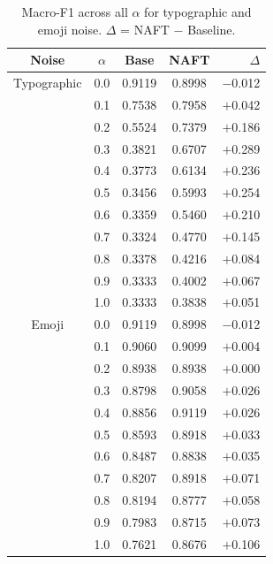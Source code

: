 \documentclass[sigconf]{acmart}
\begin{document}
\begin{table}[h]
  \centering\footnotesize\setlength{\tabcolsep}{3pt}
  \caption{Macro-F1 across all $\alpha$ for typographic and emoji
           noise. $\Delta$ = NAFT $-$ Baseline.}
  \label{tab:results}
  \begin{tabular}{ccccr}
    \toprule
    \textbf{Noise} & $\alpha$ & \textbf{Base} & \textbf{NAFT} & $\Delta$ \\
    \midrule
    Typographic & 0.0 & 0.9119 & 0.8998 & $-$0.012 \\
                & 0.1 & 0.7538 & 0.7958 & $+$0.042 \\
                & 0.2 & 0.5524 & 0.7379 & $+$0.186 \\
                & 0.3 & 0.3821 & 0.6707 & $+$0.289 \\
                & 0.4 & 0.3773 & 0.6134 & $+$0.236 \\
                & 0.5 & 0.3456 & 0.5993 & $+$0.254 \\
                & 0.6 & 0.3359 & 0.5460 & $+$0.210 \\
                & 0.7 & 0.3324 & 0.4770 & $+$0.145 \\
                & 0.8 & 0.3378 & 0.4216 & $+$0.084 \\
                & 0.9 & 0.3333 & 0.4002 & $+$0.067 \\
                & 1.0 & 0.3333 & 0.3838 & $+$0.051 \\
    \addlinespace
    Emoji       & 0.0 & 0.9119 & 0.8998 & $-$0.012 \\
                & 0.1 & 0.9060 & 0.9099 & $+$0.004 \\
                & 0.2 & 0.8938 & 0.8938 & $+$0.000 \\
                & 0.3 & 0.8798 & 0.9058 & $+$0.026 \\
                & 0.4 & 0.8856 & 0.9119 & $+$0.026 \\
                & 0.5 & 0.8593 & 0.8918 & $+$0.033 \\
                & 0.6 & 0.8487 & 0.8838 & $+$0.035 \\
                & 0.7 & 0.8207 & 0.8918 & $+$0.071 \\
                & 0.8 & 0.8194 & 0.8777 & $+$0.058 \\
                & 0.9 & 0.7983 & 0.8715 & $+$0.073 \\
                & 1.0 & 0.7621 & 0.8676 & $+$0.106 \\
    \bottomrule
  \end{tabular}
\end{table}
\end{document}
